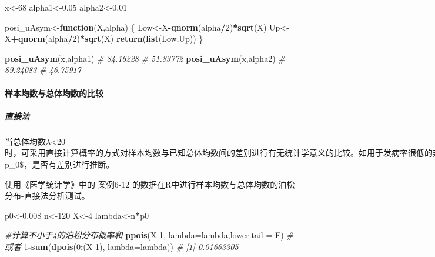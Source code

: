 \documentclass[
]{article}
\newenvironment{Shaded}{\begin{snugshade}}{\end{snugshade}}
\newcommand{\CommentTok}[1]{\textcolor[rgb]{0.56,0.35,0.01}{\textit{#1}}}
\newcommand{\ControlFlowTok}[1]{\textcolor[rgb]{0.13,0.29,0.53}{\textbf{#1}}}
\newcommand{\DataTypeTok}[1]{\textcolor[rgb]{0.13,0.29,0.53}{#1}}
\newcommand{\DecValTok}[1]{\textcolor[rgb]{0.00,0.00,0.81}{#1}}
\newcommand{\FloatTok}[1]{\textcolor[rgb]{0.00,0.00,0.81}{#1}}
\newcommand{\KeywordTok}[1]{\textcolor[rgb]{0.13,0.29,0.53}{\textbf{#1}}}
\newcommand{\NormalTok}[1]{#1}
\newcommand{\OperatorTok}[1]{\textcolor[rgb]{0.81,0.36,0.00}{\textbf{#1}}}
\begin{document}
\begin{Shaded}
\begin{Highlighting}[]
\NormalTok{x<-}\DecValTok{68}
\NormalTok{alpha1<-}\FloatTok{0.05}
\NormalTok{alpha2<-}\FloatTok{0.01}

\NormalTok{posi_uAsym<-}\ControlFlowTok{function}\NormalTok{(X,alpha) \{}
\NormalTok{  Low<-X}\OperatorTok{-}\KeywordTok{qnorm}\NormalTok{(alpha}\OperatorTok{/}\DecValTok{2}\NormalTok{)}\OperatorTok{*}\KeywordTok{sqrt}\NormalTok{(X)}
\NormalTok{  Up<-X}\OperatorTok{+}\KeywordTok{qnorm}\NormalTok{(alpha}\OperatorTok{/}\DecValTok{2}\NormalTok{)}\OperatorTok{*}\KeywordTok{sqrt}\NormalTok{(X)}
  \KeywordTok{return}\NormalTok{(}\KeywordTok{list}\NormalTok{(Low,Up))}
\NormalTok{\}}

\KeywordTok{posi_uAsym}\NormalTok{(x,alpha1)}
\CommentTok{# 84.16228}
\CommentTok{# 51.83772}
\KeywordTok{posi_uAsym}\NormalTok{(x,alpha2)}
\CommentTok{# 89.24083}
\CommentTok{# 46.75917}
\end{Highlighting}
\end{Shaded}

\hypertarget{ux6837ux672cux5747ux6570ux4e0eux603bux4f53ux5747ux6570ux7684ux6bd4ux8f83}{%
\paragraph{样本均数与总体均数的比较}\label{ux6837ux672cux5747ux6570ux4e0eux603bux4f53ux5747ux6570ux7684ux6bd4ux8f83}}

\hypertarget{ux76f4ux63a5ux6cd5-2}{%
\subparagraph{直接法}\label{ux76f4ux63a5ux6cd5-2}}

当总体均数\(\lambda\)\textless20\(时，可采用直接计算概率的方式对样本均数与已知总体均数间的差别进行有无 统计学意义的比较。如用于发病率很低的非传染性疾病，则是对以样本计数X为代表的总体率p与已知的总 体率\)p\_0\$，是否有差别进行推断。

使用《医学统计学》中的 案例6-12 的数据在R中进行样本均数与总体均数的泊松分布-直接法分析测试。

\begin{Shaded}
\begin{Highlighting}[]
\NormalTok{p0<-}\FloatTok{0.008}
\NormalTok{n<-}\DecValTok{120}
\NormalTok{X<-}\DecValTok{4}
\NormalTok{lambda<-n}\OperatorTok{*}\NormalTok{p0}

\CommentTok{#计算不小于4的泊松分布概率和}
\KeywordTok{ppois}\NormalTok{(X}\DecValTok{-1}\NormalTok{, }\DataTypeTok{lambda=}\NormalTok{lambda,}\DataTypeTok{lower.tail =}\NormalTok{ F)}
\CommentTok{#或者}
\DecValTok{1}\OperatorTok{-}\KeywordTok{sum}\NormalTok{(}\KeywordTok{dpois}\NormalTok{(}\DecValTok{0}\OperatorTok{:}\NormalTok{(X}\DecValTok{-1}\NormalTok{), }\DataTypeTok{lambda=}\NormalTok{lambda))}
\CommentTok{# [1] 0.01663305}
\end{Highlighting}
\end{Shaded}
\end{document}
